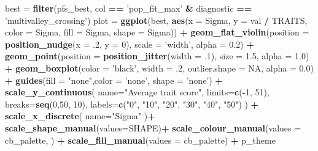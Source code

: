 \documentclass[]{book}
\newenvironment{Shaded}{\begin{snugshade}}{\end{snugshade}}
\newcommand{\DataTypeTok}[1]{\textcolor[rgb]{0.13,0.29,0.53}{#1}}
\newcommand{\DecValTok}[1]{\textcolor[rgb]{0.00,0.00,0.81}{#1}}
\newcommand{\FloatTok}[1]{\textcolor[rgb]{0.00,0.00,0.81}{#1}}
\newcommand{\KeywordTok}[1]{\textcolor[rgb]{0.13,0.29,0.53}{\textbf{#1}}}
\newcommand{\NormalTok}[1]{#1}
\newcommand{\OperatorTok}[1]{\textcolor[rgb]{0.81,0.36,0.00}{\textbf{#1}}}
\newcommand{\OtherTok}[1]{\textcolor[rgb]{0.56,0.35,0.01}{#1}}
\newcommand{\StringTok}[1]{\textcolor[rgb]{0.31,0.60,0.02}{#1}}
\begin{document}
\begin{Shaded}
\begin{Highlighting}[]
\NormalTok{best =}\StringTok{ }\KeywordTok{filter}\NormalTok{(pfs_best, col }\OperatorTok{==}\StringTok{ 'pop_fit_max'} \OperatorTok{&}\StringTok{ }\NormalTok{diagnostic }\OperatorTok{==}\StringTok{ 'multivalley_crossing'}\NormalTok{)}
\NormalTok{plot =}\StringTok{  }\KeywordTok{ggplot}\NormalTok{(best, }\KeywordTok{aes}\NormalTok{(}\DataTypeTok{x =}\NormalTok{ Sigma, }\DataTypeTok{y =}\NormalTok{ val }\OperatorTok{/}\StringTok{ }\NormalTok{TRAITS, }\DataTypeTok{color =}\NormalTok{ Sigma, }\DataTypeTok{fill =}\NormalTok{ Sigma, }\DataTypeTok{shape =}\NormalTok{ Sigma)) }\OperatorTok{+}
\StringTok{          }\KeywordTok{geom_flat_violin}\NormalTok{(}\DataTypeTok{position =} \KeywordTok{position_nudge}\NormalTok{(}\DataTypeTok{x =} \FloatTok{.2}\NormalTok{, }\DataTypeTok{y =} \DecValTok{0}\NormalTok{), }\DataTypeTok{scale =} \StringTok{'width'}\NormalTok{, }\DataTypeTok{alpha =} \FloatTok{0.2}\NormalTok{) }\OperatorTok{+}
\StringTok{          }\KeywordTok{geom_point}\NormalTok{(}\DataTypeTok{position =} \KeywordTok{position_jitter}\NormalTok{(}\DataTypeTok{width =} \FloatTok{.1}\NormalTok{), }\DataTypeTok{size =} \FloatTok{1.5}\NormalTok{, }\DataTypeTok{alpha =} \FloatTok{1.0}\NormalTok{) }\OperatorTok{+}
\StringTok{          }\KeywordTok{geom_boxplot}\NormalTok{(}\DataTypeTok{color =} \StringTok{'black'}\NormalTok{, }\DataTypeTok{width =} \FloatTok{.2}\NormalTok{, }\DataTypeTok{outlier.shape =} \OtherTok{NA}\NormalTok{, }\DataTypeTok{alpha =} \FloatTok{0.0}\NormalTok{) }\OperatorTok{+}
\StringTok{          }\KeywordTok{guides}\NormalTok{(}\DataTypeTok{fill =} \StringTok{"none"}\NormalTok{,}\DataTypeTok{color =} \StringTok{'none'}\NormalTok{, }\DataTypeTok{shape =} \StringTok{'none'}\NormalTok{) }\OperatorTok{+}
\StringTok{          }\KeywordTok{scale_y_continuous}\NormalTok{(}
            \DataTypeTok{name=}\StringTok{"Average trait score"}\NormalTok{,}
            \DataTypeTok{limits=}\KeywordTok{c}\NormalTok{(}\OperatorTok{-}\DecValTok{1}\NormalTok{, }\DecValTok{51}\NormalTok{),}
            \DataTypeTok{breaks=}\KeywordTok{seq}\NormalTok{(}\DecValTok{0}\NormalTok{,}\DecValTok{50}\NormalTok{, }\DecValTok{10}\NormalTok{),}
            \DataTypeTok{labels=}\KeywordTok{c}\NormalTok{(}\StringTok{"0"}\NormalTok{, }\StringTok{"10"}\NormalTok{, }\StringTok{"20"}\NormalTok{, }\StringTok{"30"}\NormalTok{, }\StringTok{"40"}\NormalTok{, }\StringTok{"50"}\NormalTok{)}
\NormalTok{          ) }\OperatorTok{+}
\StringTok{          }\KeywordTok{scale_x_discrete}\NormalTok{(}
            \DataTypeTok{name=}\StringTok{"Sigma"}
\NormalTok{          )}\OperatorTok{+}
\StringTok{          }\KeywordTok{scale_shape_manual}\NormalTok{(}\DataTypeTok{values=}\NormalTok{SHAPE)}\OperatorTok{+}
\StringTok{          }\KeywordTok{scale_colour_manual}\NormalTok{(}\DataTypeTok{values =}\NormalTok{ cb_palette, ) }\OperatorTok{+}
\StringTok{          }\KeywordTok{scale_fill_manual}\NormalTok{(}\DataTypeTok{values =}\NormalTok{ cb_palette) }\OperatorTok{+}
\StringTok{          }\NormalTok{p_theme}


\end{Highlighting}
\end{Shaded}
\end{document}
